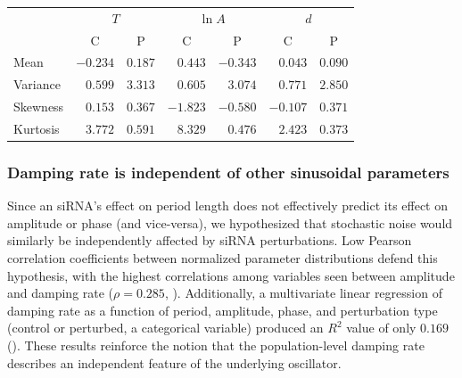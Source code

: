 \begin{table}
  \begin{center}
    \begin{tabular}{lrrrrrr}\toprule
      {} & \multicolumn{2}{c}{$T$} & \multicolumn{2}{c}{$\ln A$} & \multicolumn{2}{c}{$d$} \\
      {}         & \multicolumn{1}{c}{C}         & \multicolumn{1}{c}{P}           & \multicolumn{1}{c}{C}         & \multicolumn{1}{c}{P}               & \multicolumn{1}{c}{C}         & \multicolumn{1}{c}{P}           \\\midrule
      Mean     & $-0.234$ & $0.187$ & $0.443$  & $-0.343$ & $0.043$  & $0.090$    \\
      Variance & $ 0.599$ & $3.313$ & $0.605$  & $ 3.074$ & $0.771$  & $2.850$    \\
      Skewness & $ 0.153$ & $0.367$ & $-1.823$ & $-0.580$ & $-0.107$ & $0.371$    \\
      Kurtosis & $ 3.772$ & $0.591$ & $8.329$  & $ 0.476$ & $2.423$  & $0.373$    \\
      \bottomrule
    \end{tabular}
  \end{center}
  \label{tab:fit_distributions}
\end{table}

\subsubsection{Damping rate is independent of other sinusoidal parameters}

Since an siRNA's effect on period length does not effectively predict its effect on amplitude or phase (and vice-versa), we hypothesized that stochastic noise would similarly be independently affected by siRNA perturbations.
Low Pearson correlation coefficients between normalized parameter distributions defend this hypothesis, with the highest correlations among variables seen between amplitude and damping rate ($\rho = 0.285$, ).
Additionally, a multivariate linear regression of damping rate as a function of period, amplitude, phase, and perturbation type (control or perturbed, a categorical variable) produced an $R^2$ value of only $0.169$ ().
These results reinforce the notion that the population-level damping rate describes an independent feature of the underlying oscillator.

